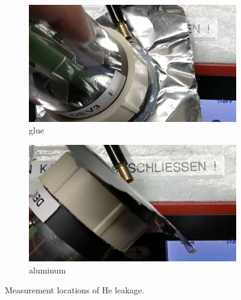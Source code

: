 \begin{figure}[h]
	\begin{subfigure}[b]{0.4\textwidth}
		\includegraphics[width=\textwidth]{./Chapters/CRT-handling/glue}
		\caption{glue}
	\end{subfigure}
	\hspace{0.1\textwidth}
	\begin{subfigure}[b]{0.4\textwidth}
		\includegraphics[width=\textwidth]{./Chapters/CRT-handling/aluminum_foil}
		\caption{aluminum}
	\end{subfigure}
	
	\caption{Measurement locations of He leakage.}
	\label{fig:Measurement locatiosn of He leakage}
\end{figure}
 


